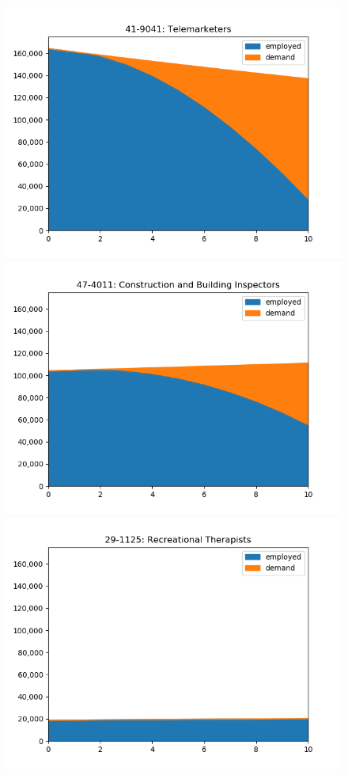 \documentclass[10pt]{article}
\begin{document}
\begin{figure}[H]
    \includegraphics[scale=0.45]{Telemarketers.png}
    \includegraphics[scale=0.45]{Construction_and_Building_Inspectors.png}
    \includegraphics[scale=0.45]{Recreational_Therapists.png}

\end{figure}
\end{document}
